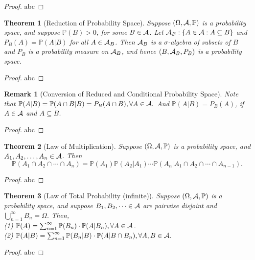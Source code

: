 \documentclass[openany,12pt]{book}
\newtheorem{theorem}{Theorem}[chapter]
\newtheorem{remark}{Remark}[chapter]
\begin{document}
\begin{proof}
  abc
\end{proof}

\begin{theorem}[Reduction of Probability Space]
Suppose $(\Omega,\mathcal{A},\mathbb{P})$ is a probability space, and suppose $\mathbb{P}(B)>0$, for some $B\in\mathcal{A}$. Let $\mathcal{A}_B:\{A\in\mathcal{A}: A\subseteq B\}$ and $P_B (A)=\mathbb{P}(A|B)$  for all $A\in\mathcal{A}_B$.  Then $\mathcal{A}_B$ is a $\sigma$-algebra of subsets of $B$ and $P_B$ is a probability measure on $\mathcal{A}_B$, and hence $(B,\mathcal{A}_B,P_B )$ is a probability space.
\end{theorem}

\begin{proof}
  abc
\end{proof}

\begin{remark}[Conversion of Reduced and Conditional Probability Space]
Note that $\mathbb{P}(A|B)=\mathbb{P}(A\cap B|B)=P_B (A\cap B),\forall A\in\mathcal{A}.$ 
And $\mathbb{P}(A|B)=P_B (A)$, if $A\in\mathcal{A}$ and $A\subseteq B$.
\end{remark}

\begin{proof}
  abc
\end{proof}

\begin{theorem}[Law of Multiplication]
  Suppose $(\Omega,\mathcal{A},\mathbb{P})$ is a probability space, and $A_1,A_2,\dots,A_n\in\mathcal{A}$. Then $$\mathbb{P}\left(A_1\cap A_2\cap\cdots\cap A_n\right)=\mathbb{P}(A_1 )\mathbb{P}(A_2|A_1 )\cdots \mathbb{P}\left(A_n|A_1 \cap A_2\cap\cdots\cap A_{n-1}\right).$$
\end{theorem}

\begin{proof}
  abc
\end{proof}

\begin{theorem}[Law of Total Probability (infinite)]
Suppose $(\Omega,\mathcal{A},\mathbb{P})$ is a probability space, and suppose $B_1,B_2,\cdots\in\mathcal{A}$ are pairwise disjoint and $\bigcup_{n=1}^\infty B_n=\Omega$. Then,\\
(1) $\mathbb{P}(A)=\sum_{n=1}^{\infty} \mathbb{P}(B_n )\cdot \mathbb{P}(A|B_n ),\forall A\in\mathcal{A}$.\\
(2) $\mathbb{P}(A|B)=\sum_{n=1}^{\infty} \mathbb{P}(B_n |B)\cdot \mathbb{P}(A|B\cap B_n ),\forall A,B\in\mathcal{A}.$
\end{theorem}

\begin{proof}
  abc
\end{proof}
\end{document}
